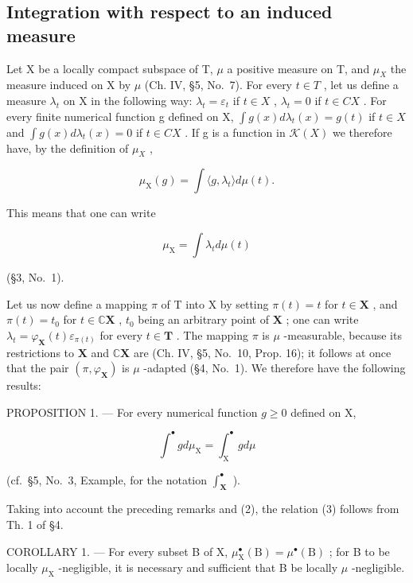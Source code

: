 \subsection{Integration with respect to an induced measure}

Let X be a locally compact subspace of T, \(\mu\) a positive measure on T, and \(\mu_{X}\) the measure induced on X by \(\mu\) (Ch. IV, §5, No.~7). For every \(t \in T\) , let us define a measure \(\lambda_{t}\) on X in the following way: \(\lambda_{t} = \varepsilon_{t}\) if \(t \in X\) , \(\lambda_{t} = 0\) if \(t \in C X\) . For every finite numerical function g defined on X, \(\int g(x) d\lambda_{t}(x) = g(t)\) if \(t \in X\) and \(\int g(x) d\lambda_{t}(x) = 0\) if \(t \in C X\) . If g is a function in \(\mathcal{K}(X)\) we therefore have, by the definition of \(\mu_{X}\) ,

\[
\mu_ {\mathrm{X}} (g) = \int \langle g, \lambda_ {t} \rangle d \mu (t).\tag{1}
\]

This means that one can write

\[
\mu_ {\mathrm{X}} = \int \lambda_ {t} d \mu (t)\tag{2}
\]

(§3, No.~1).

Let us now define a mapping \(\pi\) of T into X by setting \(\pi(t) = t\) for \(t \in \mathbf{X}\) , and \(\pi(t) = t_0\) for \(t \in \mathbb{C} \mathbf{X}\) , \(t_0\) being an arbitrary point of \(\mathbf{X}\) ; one can write \(\lambda_t = \varphi_{\mathbf{X}}(t) \varepsilon_{\pi(t)}\) for every \(t \in \mathbf{T}\) . The mapping \(\pi\) is \(\mu\) -measurable, because its restrictions to \(\mathbf{X}\) and \(\mathbb{C} \mathbf{X}\) are (Ch. IV, §5, No.~10, Prop. 16); it follows at once that the pair \((\pi, \varphi_{\mathbf{X}})\) is \(\mu\) -adapted (§4, No.~1). We therefore have the following results:

PROPOSITION 1. --- For every numerical function \(g \geqslant 0\) defined on X,

\[
\int^ {\bullet} g d \mu_ {\mathrm{X}} = \int_ {\mathrm{X}} ^ {\bullet} g d \mu\tag{3}
\]

(cf.~§5, No.~3, Example, for the notation \(\int_{\mathbf{X}}^{\bullet}\) ).

Taking into account the preceding remarks and (2), the relation (3) follows from Th. 1 of §4.

COROLLARY 1. --- For every subset B of X, \(\mu_{\mathrm{X}}^{\bullet}(\mathrm{B}) = \mu^{\bullet}(\mathrm{B})\) ; for B to be locally \(\mu_{\mathrm{X}}\) -negligible, it is necessary and sufficient that B be locally \(\mu\) -negligible.

